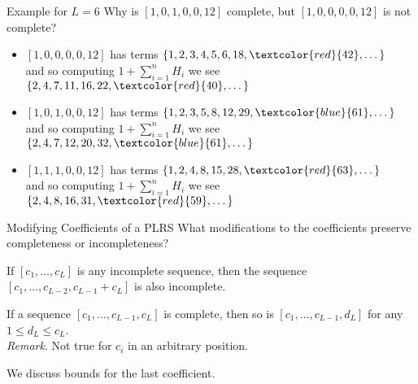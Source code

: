 \documentclass[handout]{beamer}
\begin{document}
\begin{frame}{
    Example for $L=6$}
Why is $[1,0,1,0,0,12]$ complete, but $[1,0,0,0,0,12]$ is not complete? \\
\begin{itemize}
\pause
\item $[1,0,0,0,0,12]$ has terms $\{1,2,3,4,5,6,18,\textcolor{red}{42},\dots \}$\\
         and so computing $1 + \sum_{i=1}^{n}H_i$ we see $\{2,4,7,11,16,22,\textcolor{red}{40},\dots \}$\\    
\pause
\item $[1,0,1,0,0,12]$ has terms $\{1,2,3,5,8,12,29,\textcolor{blue}{61},\dots \}$\\
         and so computing $1 + \sum_{i=1}^{n}H_i$ we see $\{2,4,7,12,20,32,\textcolor{blue}{61},\dots \}$\\
\pause
\item $[1,1,1,0,0,12]$ has terms $\{1, 2, 4, 8, 15, 28,\textcolor{red}{63},\dots \}$\\
         and so computing $1 + \sum_{i=1}^{n}H_i$ we see $\{2,4,8,16,31,\textcolor{red}{59},\dots \}$\\
\end{itemize}
\end{frame}

\begin{frame}{Modifying Coefficients of a PLRS}
What modifications to the coefficients preserve completeness or incompleteness?
\pause
	\begin{theorem}[SMALL 2020]
	If $[c_1,\ldots , c_{L}]$ is any incomplete sequence, then the sequence $[c_1,\ldots ,c_{L-2}, c_{L-1}+c_{L}]$ is also incomplete.
\end{theorem}
\pause
\bigskip
\begin{theorem}[SMALL 2020]
If a sequence $[c_1, \ldots, c_{L-1}, c_L]$ is complete, then so is $[c_1, \ldots, c_{L-1}, d_L]$ for any $1 \le d_L \leq c_L$.\\
    \emph{Remark}. Not true for $c_i$ in an arbitrary position.

\end{theorem}
We discuss bounds for the last coefficient.%
\end{frame}
\end{document}
